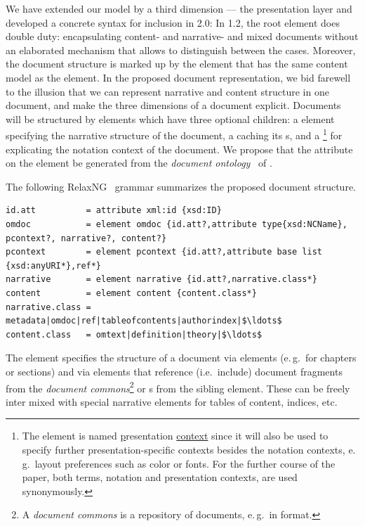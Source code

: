 \documentclass[pdftex,bibtotocnumbered,idxtotoc,11pt]{scrartcl}
\begin{document}
We have extended our {\narcon} model by a third dimension --- the presentation layer and
developed a concrete syntax for inclusion in {\omdoc}2.0: In {\omdoc}1.2, the root element
{} does double duty: encapsulating content- and narrative- and mixed
documents without an elaborated mechanism that allows to distinguish between the
cases. Moreover, the document structure is marked up by the {} element
that has the same content model as the {} element. In the proposed document
representation, we bid farewell to the illusion that we can represent narrative and
content structure in one document, and make the three dimensions of a document explicit.
Documents will be structured by {} elements which have three optional
children: a {} element specifying the narrative structure of the
document, a {} caching its {\infom}s, and a
{}\footnote{The element is named \underline{p}resentation
  \underline{context} since it will also be used to specify further presentation-specific
  contexts besides the notation contexts, e.\,g.\ layout preferences such as color or
  fonts. For the further course of the paper, both terms, notation and presentation
  contexts, are used synonymously.} for explicating the notation context of the
document. We propose that the {} attribute on the {}
element be generated from the {\emph{document ontology}}~\cite{NRM:wp1:07} of {\omdoc}.

The following RelaxNG~\cite{Vlist:Relaxng} grammar summarizes the proposed document
structure.

\begin{lstlisting}[mathescape,numbers=none]
id.att          = attribute xml:id {xsd:ID}
omdoc           = element omdoc {id.att?,attribute type{xsd:NCName}, pcontext?, narrative?, content?}
pcontext        = element pcontext {id.att?,attribute base list {xsd:anyURI*},ref*}
narrative       = element narrative {id.att?,narrative.class*}
content         = element content {content.class*}
narrative.class = metadata|omdoc|ref|tableofcontents|authorindex|$\ldots$
content.class   = omtext|definition|theory|$\ldots$
\end{lstlisting}

The {} element specifies the structure of a document via
{} elements (e.\,g.\ for chapters or sections) and via {}
elements that reference (i.e.\ include) document fragments from the {\emph{document
    commons}}\footnote{A {\emph{document commons}} is a repository of documents, e.\,g.\
  in {\omdoc} format.} or {\infom}s from the sibling {} element. These
can be freely inter mixed with special narrative elements for tables of content, indices,
etc.
\end{document}
